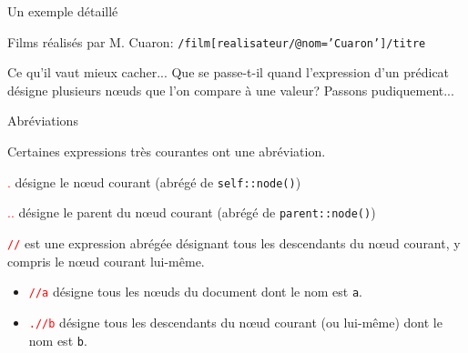 \begin{frame}{Un exemple détaillé}

Films réalisés par M. Cuaron: \texttt{/film[realisateur/@nom='Cuaron']/titre}

\vfill


\vfill

\begin{block}{Ce qu'il vaut mieux cacher...}
Que se passe-t-il quand l'expression d'un prédicat désigne \alert{plusieurs} nœuds
que l'on compare à \alert{une} valeur? Passons pudiquement...
\end{block}

\end{frame}

\begin{frame}{Abréviations}

Certaines expressions très courantes ont une abréviation.

\vfill


\textcolor{red}{.} désigne le nœud courant (abrégé de \texttt{self::node()})

\vfill


\textcolor{red}{..} désigne le  parent du nœud courant (abrégé de \texttt{parent::node()})

\vfill

\textcolor{red}{\texttt{//}} est une expression abrégée désignant tous les descendants du 
  nœud courant, y compris le nœud courant lui-même.
  
  \begin{itemize}
     \item \textcolor{red}{\texttt{//a}} désigne tous les nœuds du document dont le nom est \texttt{a}.
     \item \textcolor{red}{\texttt{.//b}} désigne tous les descendants du nœud courant (ou lui-même)
          dont le nom est \texttt{b}.
  \end{itemize}


\end{frame}

